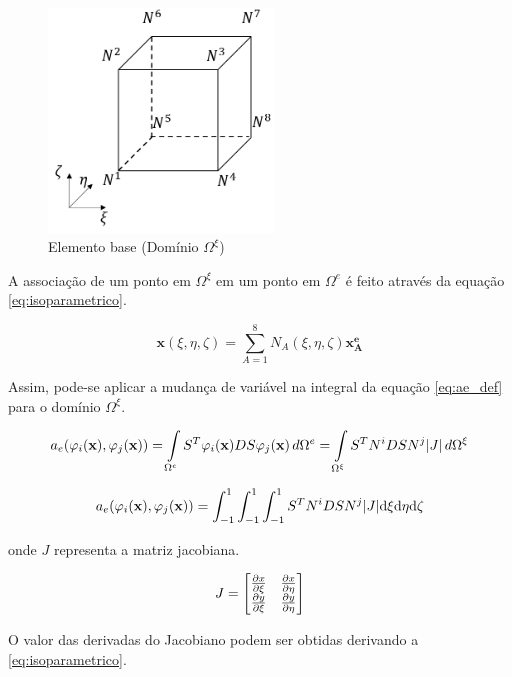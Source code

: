 \begin{figure}[!htbp]
\label{fig:elemento_base}
\centering
\includegraphics[width=6cm]{chap01/elemento_base.png}
\caption{Elemento base (Domínio $\Omega^\xi$)}
\end{figure}



A associação de um ponto em $\Omega^\xi$ em um ponto em $\Omega^e$ é feito através da equação \ref{eq:isoparametrico}.


\begin{equation}
\label{eq:isoparametrico}
\mathbf{x}(\xi, \eta, \zeta) = \sum_{A=1}^{8} N_A(\xi, \eta, \zeta) \mathbf{x^e_A}
\end{equation}

Assim, pode-se aplicar a mudança de variável na integral da equação \ref{eq:ae_def} para o domínio $\Omega^\xi$.

\begin{equation}
 a_e(\phiix,\phijx) = \omeeint{S^T\phiix D S\phijx} = \omeint[\Omega^\xi]{S^T N^i D S N^j |J|}
\end{equation}


\begin{equation}
 a_e(\phiix,\phijx) = \int^1_ {-1}\int^1_ {-1}\int^1_ {-1}{S^T N^i D S N^j |J|} \text{d}\xi \text{d}\eta \text{d}\zeta
\end{equation}

onde $J$ representa a matriz jacobiana.

\begin{equation}
J = \begin{bmatrix}
\dxi[x]   &  \deta[x]  \\
  \dxi[y] &  \deta[y] 
\end{bmatrix}
\label{eq:jacobiano}
\end{equation}

O valor das derivadas do Jacobiano podem ser obtidas derivando a \ref{eq:isoparametrico}.


